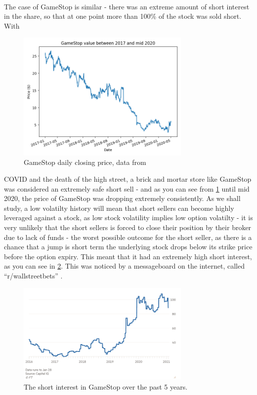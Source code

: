 \documentclass[11pt]{article} %
\begin{document}
\paragraph{}
The case of GameStop is similar - there was an extreme amount of short interest in 
the share, so that at one point more than 100\% of the stock was sold short. With 
\begin{figure}[h]
    \centering
    \includegraphics[width=0.75\textwidth]{gameStopPriorValue.png}
    \caption{GameStop daily closing price, data from \cite{nasdaq} }\label{gamestopprice}
    \end{figure}
    COVID and the death of the high street, a brick and mortar store like GameStop was 
considered an extremely safe short sell - and as you can see from \ref{gamestopprice}  
until mid 2020, the price of GameStop was dropping extremely consistently. As we shall study, 
a low volatilty history will mean that short sellers can become highly leveraged against a 
stock, as low stock volatility implies low option volatilty - it is very unlikely that 
the short sellers is forced to close their position by their broker due to lack of funds - 
the worst possible outcome for the short seller, as there is a chance that a jump is short 
term the underlying stock drops below its strike price before the option expiry. This  
meant that it had an extremely high short interest, as you can see in \ref{shortinterest}. 
This was noticed by a messageboard on the internet, called ``r/wallstreetbets'' \cite{wsb}. 
\begin{figure}[h]
    \centering
    \includegraphics[width=0.75\textwidth]{shortinterest.png}
    \caption{The short interest in GameStop over the past 5 years.}
    \label{shortinterest}
    \end{figure}
\end{document}
